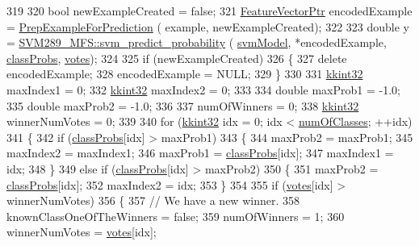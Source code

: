 \begin{DoxyCode}
319 
320   \textcolor{keywordtype}{bool}  newExampleCreated = \textcolor{keyword}{false};
321   \hyperlink{class_k_k_m_l_l_1_1_feature_vector}{FeatureVectorPtr}  encodedExample = \hyperlink{class_k_k_m_l_l_1_1_model_a31b972adfb64769b3ae966debec824fd}{PrepExampleForPrediction} (
      example, newExampleCreated);
322 
323   \textcolor{keywordtype}{double}  y = \hyperlink{namespace_s_v_m289___m_f_s_ac0623d29bd02989f751e50d1cb3c8855}{SVM289\_MFS::svm\_predict\_probability} (
      \hyperlink{class_k_k_m_l_l_1_1_model_svm_base_a8f6ed793dfaa080ddea8e1776d2ee755}{svmModel},  *encodedExample, \hyperlink{class_k_k_m_l_l_1_1_model_a9d51bc464ab7049659aeea120bf9db26}{classProbs}, \hyperlink{class_k_k_m_l_l_1_1_model_a7d13e2ff97ace39ec4423fd4bfa9ecf2}{votes});
324 
325   \textcolor{keywordflow}{if}  (newExampleCreated)
326   \{
327     \textcolor{keyword}{delete} encodedExample;
328     encodedExample = NULL;
329   \}
330 
331   \hyperlink{namespace_k_k_b_a8fa4952cc84fda1de4bec1fbdd8d5b1b}{kkint32}  maxIndex1 = 0;
332   \hyperlink{namespace_k_k_b_a8fa4952cc84fda1de4bec1fbdd8d5b1b}{kkint32}  maxIndex2 = 0;
333 
334   \textcolor{keywordtype}{double}  maxProb1 = -1.0;
335   \textcolor{keywordtype}{double}  maxProb2 = -1.0;
336 
337   numOfWinners = 0;
338   \hyperlink{namespace_k_k_b_a8fa4952cc84fda1de4bec1fbdd8d5b1b}{kkint32}  winnerNumVotes = 0;
339 
340   \textcolor{keywordflow}{for}  (\hyperlink{namespace_k_k_b_a8fa4952cc84fda1de4bec1fbdd8d5b1b}{kkint32} idx = 0;  idx < \hyperlink{class_k_k_m_l_l_1_1_model_ad41340e916a5ccdae7ed38d9546a8445}{numOfClasses};  ++idx)
341   \{
342     \textcolor{keywordflow}{if}  (\hyperlink{class_k_k_m_l_l_1_1_model_a9d51bc464ab7049659aeea120bf9db26}{classProbs}[idx] > maxProb1)
343     \{
344       maxProb2  = maxProb1;
345       maxIndex2 = maxIndex1;
346       maxProb1  = \hyperlink{class_k_k_m_l_l_1_1_model_a9d51bc464ab7049659aeea120bf9db26}{classProbs}[idx];
347       maxIndex1 = idx;
348     \}
349     \textcolor{keywordflow}{else} \textcolor{keywordflow}{if}  (\hyperlink{class_k_k_m_l_l_1_1_model_a9d51bc464ab7049659aeea120bf9db26}{classProbs}[idx] > maxProb2)
350     \{
351       maxProb2 = \hyperlink{class_k_k_m_l_l_1_1_model_a9d51bc464ab7049659aeea120bf9db26}{classProbs}[idx];
352       maxIndex2 = idx;
353     \}
354 
355     \textcolor{keywordflow}{if}  (\hyperlink{class_k_k_m_l_l_1_1_model_a7d13e2ff97ace39ec4423fd4bfa9ecf2}{votes}[idx] > winnerNumVotes)
356     \{
357       \textcolor{comment}{// We have a new winner.}
358       knownClassOneOfTheWinners = \textcolor{keyword}{false};
359       numOfWinners = 1;
360       winnerNumVotes = \hyperlink{class_k_k_m_l_l_1_1_model_a7d13e2ff97ace39ec4423fd4bfa9ecf2}{votes}[idx];

\end{DoxyCode}
